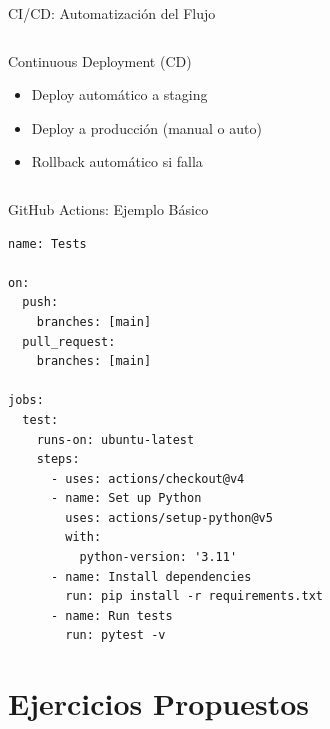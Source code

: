 \documentclass[aspectratio=169]{beamer}
\begin{document}
\begin{frame}{CI/CD: Automatización del Flujo}
\begin{columns}[t]
        \begin{block}{Continuous Deployment (CD)}
            \begin{itemize}
                \item Deploy automático a staging
                \item Deploy a producción (manual o auto)
                \item Rollback automático si falla
            \end{itemize}
        \end{block}
    \end{columns}
\end{frame}

\begin{frame}[fragile]{GitHub Actions: Ejemplo Básico}
\begin{lstlisting}[title=.github/workflows/test.yml]
name: Tests

on:
  push:
    branches: [main]
  pull_request:
    branches: [main]

jobs:
  test:
    runs-on: ubuntu-latest
    steps:
      - uses: actions/checkout@v4
      - name: Set up Python
        uses: actions/setup-python@v5
        with:
          python-version: '3.11'
      - name: Install dependencies
        run: pip install -r requirements.txt
      - name: Run tests
        run: pytest -v
\end{lstlisting}
\end{frame}

\section{Ejercicios Propuestos}
\end{document}
